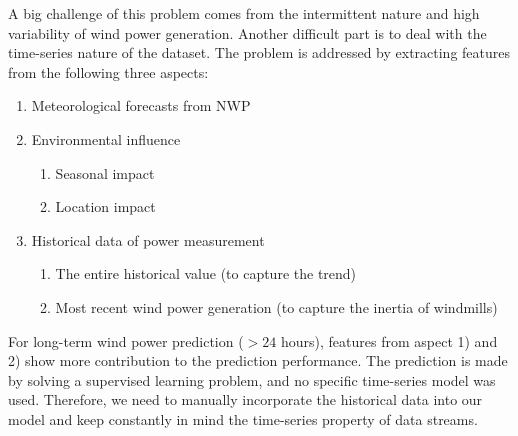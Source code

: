 \documentclass[conference]{IEEEtran}
\begin{document}
A big challenge of this problem comes from the intermittent nature and high variability of wind power generation. Another difficult part is to deal with the time-series nature of the dataset. The problem is addressed by extracting features from the following three aspects:
\begin{enumerate}
\item Meteorological forecasts from NWP
\item Environmental influence
  \begin{enumerate}
    \item Seasonal impact
    \item Location impact
  \end{enumerate}
\item Historical data of power measurement
  \begin{enumerate}
    \item The entire historical value (to capture the trend)
    \item Most recent wind power generation (to capture the inertia of windmills)
  \end{enumerate}
\end{enumerate}

For long-term wind power prediction ($> 24$ hours), features from aspect 1) and 2) show more contribution to the prediction performance. The prediction is made by solving a supervised learning problem, and no specific time-series model was used. Therefore, we need to manually incorporate the historical data into our model and keep constantly in mind the time-series property of data streams. 
\end{document}
